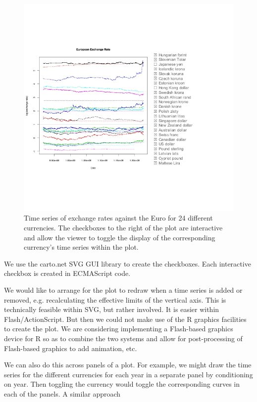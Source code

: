 \documentclass[article]{jss}
\begin{document}
\begin{figure}
  \centering
\includegraphics{euSeries.jpg}  
  \caption{Time series of exchange rates against the Euro for 24
    different currencies.  The checkboxes to the right of the plot
    are interactive and allow the viewer to toggle the display of the
    corresponding currency's time series within the plot.}
  \label{fig:euCheckbox}
\end{figure}

We use the carto.net SVG GUI library
to create the checkboxes.
Each interactive checkbox is created 
in ECMAScript code.


We would like to arrange for the plot to redraw
when a time series is added or  removed, e.g.
recalculating the effective limits of the vertical axis.
This is technically feasible within SVG, but rather involved.
It is easier within Flash/ActionScript.  But then we could 
not make use of the R graphics facilities to create the plot.
We are considering implementing a Flash-based graphics device
for R so as to combine the two systems and allow for post-processing
of Flash-based graphics to add animation, etc.


We can also do this across panels of a plot.  For example, we might
draw the time series for the different currencies for each year in a
separate panel by conditioning on year.  Then toggling the currency
would toggle the corresponding curves in each of the panels.
A similar approach
\end{document}
